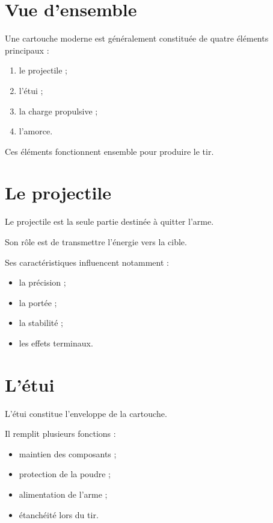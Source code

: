 \section{Vue d'ensemble}

Une cartouche moderne est généralement constituée de quatre éléments
principaux :

\begin{enumerate}
    \item le projectile ;
    \item l'étui ;
    \item la charge propulsive ;
    \item l'amorce.
\end{enumerate}

Ces éléments fonctionnent ensemble pour produire le tir.

\section{Le projectile}

Le projectile est la seule partie destinée à quitter l'arme.

Son rôle est de transmettre l'énergie vers la cible.

Ses caractéristiques influencent notamment :

\begin{itemize}
    \item la précision ;
    \item la portée ;
    \item la stabilité ;
    \item les effets terminaux.
\end{itemize}

\section{L'étui}

L'étui constitue l'enveloppe de la cartouche.

Il remplit plusieurs fonctions :

\begin{itemize}
    \item maintien des composants ;
    \item protection de la poudre ;
    \item alimentation de l'arme ;
    \item étanchéité lors du tir.
\end{itemize}

